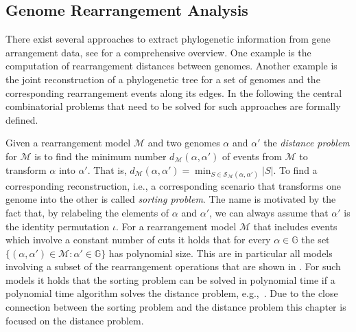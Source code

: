 \documentclass{svmult}
\begin{document}
\subsection{Genome Rearrangement Analysis}

There exist several approaches to extract phylogenetic information from 
gene arrangement data, see \cite{Felsenstein_2004} for a comprehensive
overview. One example is the computation of rearrangement distances between genomes. Another example is the
joint reconstruction of a phylogenetic tree for a set of genomes and the corresponding rearrangement events along its edges. 
In the following the central 
combinatorial problems that need to be solved for such approaches are formally defined.

Given a rearrangement model $\mathcal{M}$ and two genomes $\alpha$ and $\alpha'$ the 
\emph{distance problem} for $\mathcal{M}$ is to find the minimum number 
$d_\mathcal{M}(\alpha,\alpha')$ of events from $\mathcal{M}$ to transform
$\alpha$ into $\alpha'$. That is,
$d_\mathcal{M}(\alpha,\alpha')=\min_{S\in\mathcal{S}_\mathcal{M}(\alpha,\alpha')}|S|$.
To find a corresponding reconstruction, i.e., a corresponding scenario that transforms one genome into 
the other is called \emph{sorting problem}. The name is motivated by the fact that, 
by relabeling the elements of $\alpha$ and $\alpha'$, we can always assume that $\alpha'$ is the identity
permutation $\iota$. 
%
For a rearrangement model $\mathcal{M}$ that includes events which involve a
constant number of cuts it holds that for every $\alpha\in\mathbb{G}$ the set 
$\{ (\alpha,\alpha')\in \mathcal{M} : \alpha'\in\mathbb{G} \}$ has
polynomial size. This are in particular all models involving a subset of the
rearrangement operations that are shown in . 
For such models it holds that the sorting problem can be solved 
in polynomial time if a polynomial time algorithm solves the distance problem, e.g.,~\cite{Bergeron_2010,Hannenhalli_1999}.
Due to the close connection between the sorting problem and the distance problem this chapter is focused on the distance problem. 
\end{document}

